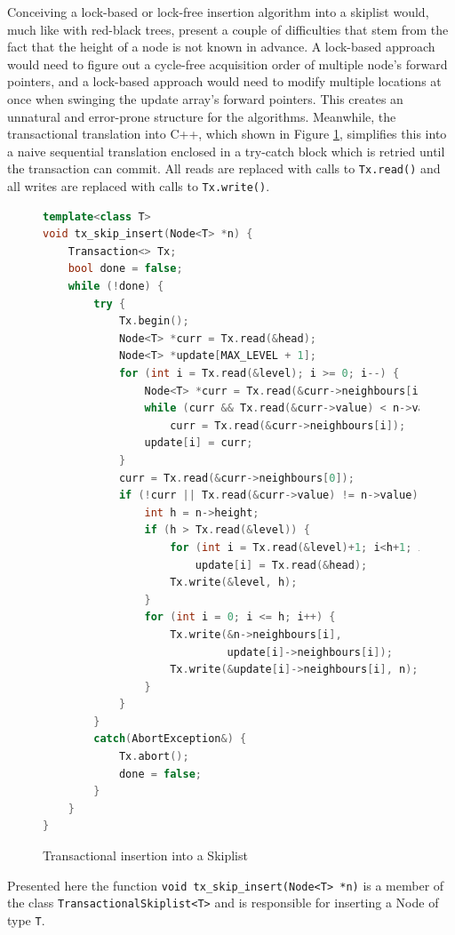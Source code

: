 Conceiving a lock-based or lock-free insertion algorithm into a skiplist would, much like with red-black trees, present a couple of difficulties that stem from the fact that the height of a node is not known in advance. A lock-based approach would need to figure out a cycle-free acquisition order of multiple node's forward pointers, and a lock-based approach would need to modify multiple locations at once when swinging the update array's forward pointers. This creates an unnatural and error-prone structure for the algorithms. Meanwhile, the transactional translation into C++, which shown in Figure \ref{fig:tx_skip_insert}, simplifies this into a naive sequential translation enclosed in a try-catch block which is retried until the transaction can commit. All reads are replaced with calls to \texttt{Tx.read()} and all writes are replaced with calls to \texttt{Tx.write()}.

\begin{figure}[!htb]
\begin{lstlisting}[language=C++]
template<class T>
void tx_skip_insert(Node<T> *n) {
    Transaction<> Tx;
    bool done = false;
    while (!done) {
        try {
            Tx.begin();
            Node<T> *curr = Tx.read(&head);
            Node<T> *update[MAX_LEVEL + 1];
            for (int i = Tx.read(&level); i >= 0; i--) {
                Node<T> *curr = Tx.read(&curr->neighbours[i]);
                while (curr && Tx.read(&curr->value) < n->value)
                    curr = Tx.read(&curr->neighbours[i]);
                update[i] = curr;
            }
            curr = Tx.read(&curr->neighbours[0]);
            if (!curr || Tx.read(&curr->value) != n->value) {
                int h = n->height;
                if (h > Tx.read(&level)) {
                    for (int i = Tx.read(&level)+1; i<h+1; i++)
                        update[i] = Tx.read(&head);
                    Tx.write(&level, h);
                }
                for (int i = 0; i <= h; i++) {
                    Tx.write(&n->neighbours[i], 
                             update[i]->neighbours[i]);
                    Tx.write(&update[i]->neighbours[i], n);
                }
            }
        }
        catch(AbortException&) {
            Tx.abort();
            done = false;
        }
    }
}
\end{lstlisting}
\caption{Transactional insertion into a Skiplist}
\label{fig:tx_skip_insert}
\end{figure}

Presented here the function \texttt{void tx\_skip\_insert(Node<T> *n)} is a member of the class \texttt{TransactionalSkiplist<T>} and is responsible for inserting a Node of type \texttt{T}.
